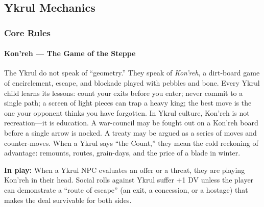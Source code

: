 



\subsection{Ykrul Mechanics}
\label{sec:ykrul-mechanics}

\subsubsection{Core Rules}

\paragraph{Kon'reh --- The Game of the Steppe}
The Ykrul do not speak of ``geometry.'' They speak of \emph{Kon'reh}, a dirt-board game of encirclement, escape, and blockade played with pebbles and bone. Every Ykrul child learns its lessons: count your exits before you enter; never commit to a single path; a screen of light pieces can trap a heavy king; the best move is the one your opponent thinks you have forgotten. In Ykrul culture, Kon'reh is not recreation---it is education. A war-council may be fought out on a Kon'reh board before a single arrow is nocked. A treaty may be argued as a series of moves and counter-moves. When a Ykrul says ``the Count,'' they mean the cold reckoning of advantage: remounts, routes, grain-days, and the price of a blade in winter.

\textbf{In play:} When a Ykrul NPC evaluates an offer or a threat, they are playing Kon'reh in their head. Social rolls against Ykrul suffer +1 DV unless the player can demonstrate a ``route of escape'' (an exit, a concession, or a hostage) that makes the deal survivable for both sides.

